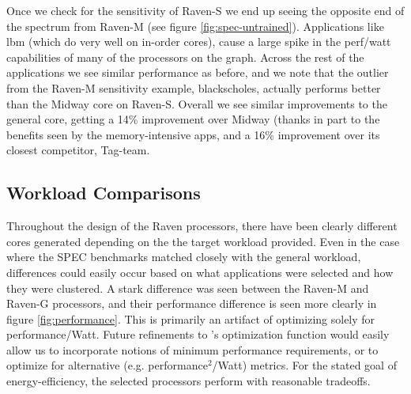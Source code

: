 Once we check for the sensitivity of Raven-S we end up seeing the
opposite end of the spectrum from Raven-M (see figure
\ref{fig:spec-untrained}). Applications like lbm (which do very well
on in-order cores), cause a large spike in the perf/watt capabilities
of many of the processors on the graph. Across the rest of the
applications we see similar performance as before, and we note that
the outlier from the Raven-M sensitivity example, blackscholes,
actually performs better than the Midway core on Raven-S. Overall we
see similar improvements to the general core, getting a 14\%
improvement over Midway (thanks in part to the benefits seen by the
memory-intensive apps, and a 16\% improvement over its closest
competitor, Tag-team.

\subsection{Workload Comparisons}

Throughout the design of the Raven processors, there have been clearly
different cores generated depending on the the target workload
provided. Even in the case where the SPEC benchmarks matched closely
with the general workload, differences could easily occur based on
what applications were selected and how they were clustered. A stark
difference was seen between the Raven-M and Raven-G processors, and
their performance difference is seen more clearly in figure
\ref{fig:performance}. This is primarily an artifact of optimizing
solely for performance/Watt. Future refinements to \blackBox{}'s
optimization function would easily allow us to incorporate notions of
minimum performance requirements, or to optimize for alternative (e.g. performance$^2$/Watt) metrics. For the stated goal of energy-efficiency, the selected processors perform with reasonable tradeoffs.


